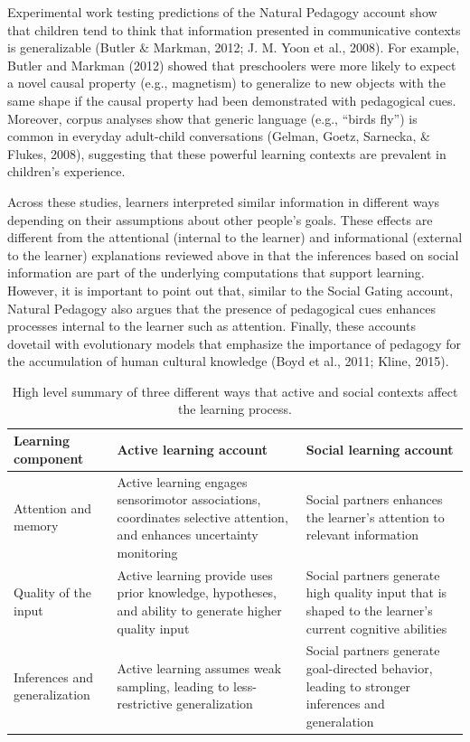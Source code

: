 \documentclass[english,floatsintext,man]{apa6}
\theoremstyle{definition}
\theoremstyle{definition}
\theoremstyle{definition}
\theoremstyle{remark}
\begin{document}
Experimental work testing predictions of the Natural Pedagogy account
show that children tend to think that information presented in
communicative contexts is generalizable (Butler \& Markman, 2012; J. M.
Yoon et al., 2008). For example, Butler and Markman (2012) showed that
preschoolers were more likely to expect a novel causal property (e.g.,
magnetism) to generalize to new objects with the same shape if the
causal property had been demonstrated with pedagogical cues. Moreover,
corpus analyses show that generic language (e.g., \enquote{birds fly})
is common in everyday adult-child conversations (Gelman, Goetz,
Sarnecka, \& Flukes, 2008), suggesting that these powerful learning
contexts are prevalent in children's experience.

Across these studies, learners interpreted similar information in
different ways depending on their assumptions about other people's
goals. These effects are different from the attentional (internal to the
learner) and informational (external to the learner) explanations
reviewed above in that the inferences based on social information are
part of the underlying computations that support learning. However, it
is important to point out that, similar to the Social Gating account,
Natural Pedagogy also argues that the presence of pedagogical cues
enhances processes internal to the learner such as attention. Finally,
these accounts dovetail with evolutionary models that emphasize the
importance of pedagogy for the accumulation of human cultural knowledge
(Boyd et al., 2011; Kline, 2015).

\begin{table}[tb]
\centering
\caption{High level summary of three different ways that  active and social contexts affect the learning process.} 
\label{act_soc}
\begin{tabular}{p{1.5in}|p{2in}|p{2in}}
 {\textbf{Learning component}} & {\textbf{Active learning account}} & {\textbf{Social learning  account}} \\ 
  \hline
Attention and memory & Active learning engages sensorimotor associations, coordinates selective attention, and enhances uncertainty monitoring & Social partners enhances the learner's attention to relevant information \\ 
   \hline
Quality of the input & Active learning provide uses prior knowledge,  hypotheses, and ability  to generate higher quality input & Social partners generate high quality input that is shaped to the learner's current cognitive abilities \\ 
   \hline
Inferences and generalization & Active learning assumes weak sampling, leading to less-restrictive generalization & Social partners generate goal-directed behavior, leading  to stronger inferences and generalation \\ 
   \hline
\end{tabular}
\end{table}
\end{document}
